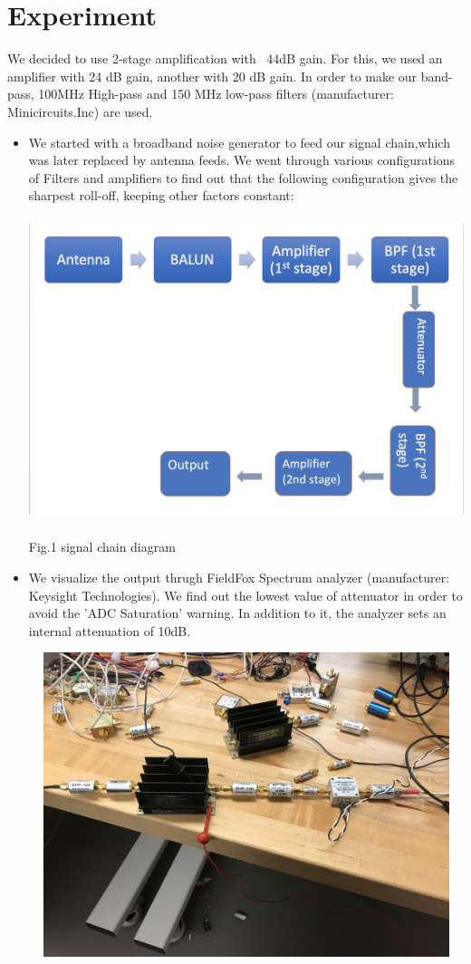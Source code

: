 \documentclass[11pt]{article}
\begin{document}
\section{Experiment}
		We decided to use 2-stage amplification with ~44dB gain. For this, we used an amplifier with 24 dB gain, another with 20 dB gain. In order to make our band-pass, 100MHz High-pass and 150 MHz low-pass filters (manufacturer: Minicircuits.Inc) are used. 
		\begin{itemize}
		\item  We started with a broadband noise generator to feed our signal chain,which was later replaced by antenna feeds. We went through various configurations of Filters and amplifiers to find out that the following configuration gives the sharpest roll-off, keeping other factors constant:

		\begin{center}
		\includegraphics[width=5in,height=3.5in]{Sig_high_freq.jpeg}

		Fig.1 signal chain diagram
		\end{center}
	    
	    \item  We visualize the output thrugh FieldFox Spectrum analyzer (manufacturer: Keysight Technologies). We find out the lowest value of attenuator in order to avoid the 'ADC Saturation' warning. In addition to it, the analyzer sets an internal attenuation of 10dB. 
		
		\begin{center}
			\includegraphics[width=5in,height=3.5in]{sig_chain.jpeg}
			

\end{center}
\end{itemize}
\end{document}
